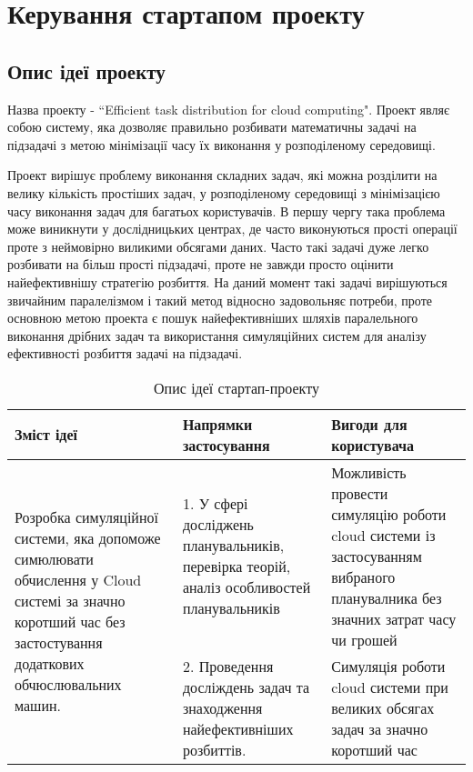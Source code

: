 \chapter{Керування стартапом проекту}
\section{Опис ідеї проекту}
Назва проекту - ``Efficient task distribution for cloud computing". Проект являє собою систему, яка дозволяє правильно розбивати математичны задачі на підзадачі з метою мінімізації часу їх виконання у розподіленому середовищі.

Проект вирішує проблему виконання складних задач, які можна розділити на велику кількість простіших задач, у розподіленому середовищі з мінімізацією часу виконання задач для багатьох користувачів. В першу чергу така проблема може виникнути у дослідницьких центрах, де часто виконуються прості операції проте з неймовірно виликими обсягами даних. Часто такі задачі дуже легко розбивати на більш прості підзадачі, проте не завжди просто оцінити найефективнішу стратегію розбиття. На даний момент такі задачі вирішуються звичайним паралелізмом і такий метод відносно задовольняє потреби, проте основною метою проекта є пошук найефективніших шляхів паралельного виконання дрібних задач та використання симуляційних систем для аналізу ефективності розбиття задачі на підзадачі. 

\begin{table}[H]
	\begin{center}
		\begin{tabular}{|p{5.5cm}|p{5.5cm}|p{5.5cm}|}
			\hline
			\bf{Зміст ідеї} & \bf{Напрямки застосування} & \bf{Вигоди для користувача}
			\\ \hline
			\multirow{2}{6cm}{
				Розробка симуляційної системи, яка допоможе симюлювати обчислення у Cloud системі за значно коротший час без застостування додаткових обчюслювальних машин.
			}                           
			& 1. У сфері досліджень планувальників, перевірка теорій, аналіз особливостей планувальників
			& Можливість провести симуляцію роботи cloud системи із застосуванням вибраного планувалника без значних затрат часу чи грошей
			\\ \cline{2-3}
			
			& 2. Проведення досліждень задач та знаходження найефективніших розбиттів.
			& Симуляція роботи cloud системи при великих обсягах задач за значно коротший час
			\\ \hline
		\end{tabular}
	\end{center}
	\caption{Опис ідеї стартап-проекту}
\end{table}

